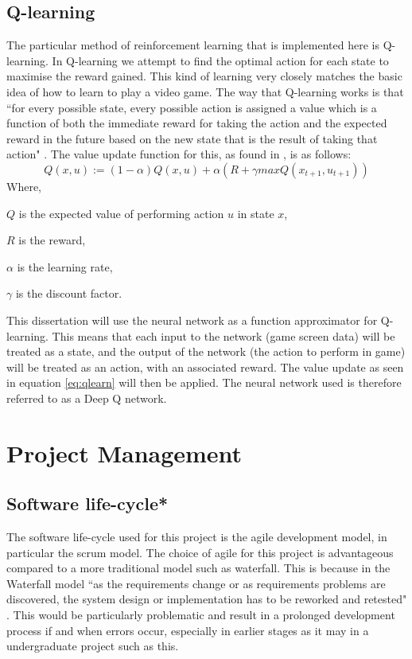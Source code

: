 \documentclass[10pt]{article}
\begin{document}
		\subsection{Q-learning}
		The particular method of reinforcement learning that is implemented here is Q-learning. In Q-learning we attempt to find the optimal action for each state to maximise the reward gained. This kind of learning very closely matches the basic idea of how to learn to play a video game. The way that Q-learning works is that ``for every possible state, every possible action is assigned a value which is a function of both the immediate reward for taking the action and the expected reward in the future based on the new state that is the result of taking that action" \cite{qlearning}. The value update function for this, as found in \cite{qlearning}, is as follows:
		\begin{equation}\label{eq:qlearn}
			Q(x,u) := (1 - \alpha)Q(x,u) + \alpha(R + \gamma maxQ(x_{t+1},u_{t+1}))
		\end{equation}				
		Where, 
		\begin{list}{•}{•}
			\item $Q$ is the expected value of performing action $u$ in state $x$,
			\item $R$ is the reward,
			\item $\alpha$ is the learning rate,
			\item $\gamma$ is the discount factor.
		\end{list}
		This dissertation will use the neural network as a function approximator for Q-learning. This means that each input to the network (game screen data) will be treated as a state, and the output of the network (the action to perform in game) will be treated as an action, with an associated reward. The value update as seen in equation \ref{eq:qlearn} will then be applied. The neural network used is therefore referred to as a Deep Q network.
		
		\bigskip
	
\section{Project Management}
	\subsection{Software life-cycle*}
		The software life-cycle used for this project is the agile development model, in particular the scrum model. The choice of agile for this project is advantageous compared to a more traditional model such as waterfall. This is because in the Waterfall model ``as the requirements change or as requirements problems are discovered, the system design or implementation has to be reworked and retested" \cite{swengi}. This would be particularly problematic and result in a prolonged development process if and when errors occur, especially in earlier stages as it may in a undergraduate project such as this.\\
		
\end{document}
